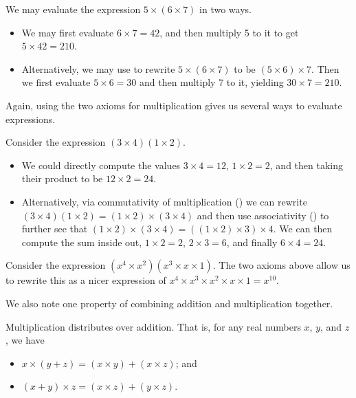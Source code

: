 \begin{example}
    We may evaluate the expression $5\times(6\times7)$ in two ways.
    \begin{itemize}
        \item We may first evaluate $6\times7 = 42$, and then multiply 5 to it to get $5 \times 42 = 210$.
        \item Alternatively, we may use  to rewrite $5\times(6\times7)$ to be $(5\times6)\times7$. Then we first evaluate $5\times6 = 30$ and then multiply 7 to it, yielding $30\times7 = 210$.
    \end{itemize}
\end{example}

Again, using the two axioms for multiplication gives us several ways to evaluate expressions.

\begin{example}
    Consider the expression $(3\times4)(1\times2)$.
    \begin{itemize}
        \item We could directly compute the values $3 \times 4 = 12$, $1 \times 2 = 2$, and then taking their product to be $12\times2 = 24$.
        \item Alternatively, via commutativity of multiplication () we can rewrite $(3\times4)(1\times2)=(1\times2)\times(3\times4)$ and then use associativity () to further see that $(1\times2)\times(3\times4) = ((1\times2)\times3)\times4$. We can then compute the sum inside out, $1 \times 2 = 2$, $2 \times 3 = 6$, and finally $6 \times 4 = 24$.
    \end{itemize}
\end{example}

\begin{example}
    Consider the expression $(x^4\times x^2)(x^3 \times x \times 1)$. The two axioms above allow us to rewrite this as a nicer expression of $x^4 \times x^3 \times x^2 \times x \times 1 = x^{10}$.
\end{example}

We also note one property of combining addition and multiplication together.

\begin{axiom}\label{axiom-distributivity}
    Multiplication distributes over addition. That is, for any real numbers $x$, $y$, and $z$, we have
    \begin{itemize}
        \item $x\times(y+z) = (x\times y) + (x\times z)$; and
        \item $(x+y)\times z = (x\times z) + (y\times z)$.
    \end{itemize}
\end{axiom}

